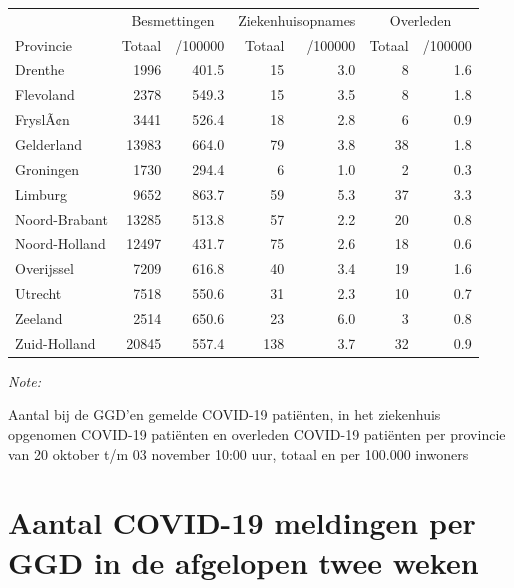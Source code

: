 \documentclass[
  english,
  man,floatsintext]{apa6}
\begin{document}
\begin{table}
\centering
\begin{threeparttable}
\begin{tabular}{lrrrrrr}
\toprule
\multicolumn{1}{c}{ } & \multicolumn{2}{c}{Besmettingen} & \multicolumn{2}{c}{Ziekenhuisopnames} & \multicolumn{2}{c}{Overleden} \\
\cmidrule(l{3pt}r{3pt}){2-3} \cmidrule(l{3pt}r{3pt}){4-5} \cmidrule(l{3pt}r{3pt}){6-7}
Provincie & Totaal & /100000 & Totaal & /100000 & Totaal & /100000\\
\midrule
Drenthe & 1996 & 401.5 & 15 & 3.0 & 8 & 1.6\\
Flevoland & 2378 & 549.3 & 15 & 3.5 & 8 & 1.8\\
FryslÃ¢n & 3441 & 526.4 & 18 & 2.8 & 6 & 0.9\\
Gelderland & 13983 & 664.0 & 79 & 3.8 & 38 & 1.8\\
Groningen & 1730 & 294.4 & 6 & 1.0 & 2 & 0.3\\
Limburg & 9652 & 863.7 & 59 & 5.3 & 37 & 3.3\\
Noord-Brabant & 13285 & 513.8 & 57 & 2.2 & 20 & 0.8\\
Noord-Holland & 12497 & 431.7 & 75 & 2.6 & 18 & 0.6\\
Overijssel & 7209 & 616.8 & 40 & 3.4 & 19 & 1.6\\
Utrecht & 7518 & 550.6 & 31 & 2.3 & 10 & 0.7\\
Zeeland & 2514 & 650.6 & 23 & 6.0 & 3 & 0.8\\
Zuid-Holland & 20845 & 557.4 & 138 & 3.7 & 32 & 0.9\\
\bottomrule
\end{tabular}
\begin{tablenotes}
\item \textit{Note: } 
\item Aantal bij de GGD’en gemelde COVID-19 patiënten, in het ziekenhuis opgenomen COVID-19 patiënten en overleden COVID-19 patiënten per provincie van 20 oktober t/m 03 november 10:00 uur, totaal en per 100.000 inwoners
\end{tablenotes}
\end{threeparttable}
\end{table}

\newpage

\hypertarget{aantal-covid-19-meldingen-per-ggd-in-de-afgelopen-twee-weken}{%
\section{Aantal COVID-19 meldingen per GGD in de afgelopen twee weken}\label{aantal-covid-19-meldingen-per-ggd-in-de-afgelopen-twee-weken}}
\end{document}

